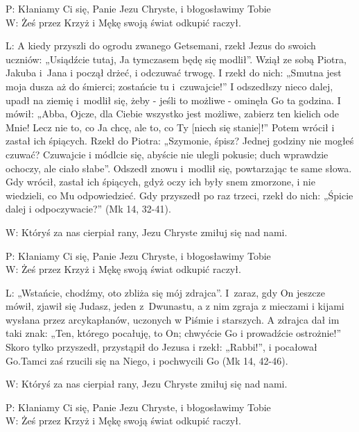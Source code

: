 ﻿\documentclass[9pt,twoside]{extarticle}
\begin{document}


{\hnr P:} Kłaniamy Ci się, Panie Jezu Chryste, i błogosławimy Tobie\\
{\hnr W:} Żeś przez Krzyż i Mękę swoją świat odkupić raczył.


{\hnr L:} A kiedy przyszli do ogrodu zwanego Getsemani, rzekł Jezus do swoich uczniów: „Usiądźcie tutaj, Ja tymczasem będę się modlił”. Wziął ze sobą Piotra, Jakuba i~Jana i począł drżeć, i odczuwać trwogę. I rzekł do nich: „Smutna jest moja dusza aż do śmierci; zostańcie tu i~czuwajcie!” I odszedłszy nieco dalej, upadł na ziemię i~modlił się, żeby - jeśli to możliwe - ominęła Go ta godzina. I mówił: „Abba, Ojcze, dla Ciebie wszystko jest możliwe, zabierz ten kielich ode Mnie! Lecz nie to, co Ja chcę, ale to, co Ty [niech się stanie]!”
Potem wrócił i zastał ich śpiących. Rzekł do Piotra: „Szymonie, śpisz? Jednej godziny nie mogłeś czuwać? Czuwajcie i módlcie się, abyście nie ulegli pokusie; duch wprawdzie ochoczy, ale ciało słabe”. Odszedł znowu i~modlił się, powtarzając te same słowa. Gdy wrócił, zastał ich śpiących, gdyż oczy ich były snem zmorzone, i nie wiedzieli, co Mu odpowiedzieć. Gdy przyszedł po raz trzeci, rzekł do nich: „Śpicie dalej i odpoczywacie?” (Mk 14, 32-41).


{\hnr W:} Któryś za nas cierpiał rany, Jezu Chryste zmiłuj się nad nami.


{\hnr{}}


{\hnr P:} Kłaniamy Ci się, Panie Jezu Chryste, i błogosławimy Tobie\\
{\hnr W:} Żeś przez Krzyż i Mękę swoją świat odkupić raczył.


{\hnr L:} „Wstańcie, chodźmy, oto zbliża się mój zdrajca”. I~zaraz, gdy On jeszcze mówił, zjawił się Judasz, jeden z~Dwunastu, a z nim zgraja z mieczami i kijami wysłana przez arcykapłanów, uczonych w Piśmie i starszych. A zdrajca dał im taki znak: „Ten, którego pocałuję, to On; chwyćcie Go i prowadźcie ostrożnie!” Skoro tylko przyszedł, przystąpił do Jezusa i rzekł: „Rabbi!”, i pocałował Go.Tamci zaś rzucili się na Niego, i pochwycili Go (Mk 14, 42-46).


{\hnr W:} Któryś za nas cierpiał rany, Jezu Chryste zmiłuj się nad nami.


{\hnr{}}


{\hnr P:} Kłaniamy Ci się, Panie Jezu Chryste, i błogosławimy Tobie\\
{\hnr W:} Żeś przez Krzyż i Mękę swoją świat odkupić raczył.
\end{document}

